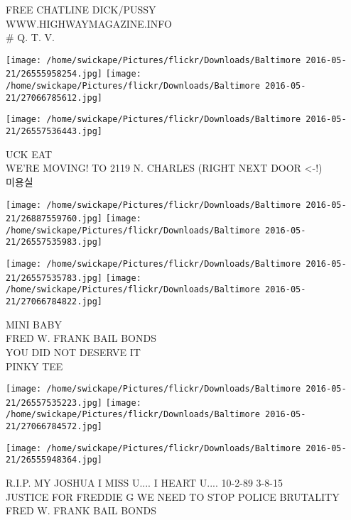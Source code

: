\documentclass[10pt,letterpaper]{article}
\begin{document}
FREE CHATLINE DICK/PUSSY\\
WWW.HIGHWAYMAGAZINE.INFO\\
\# Q. T. V.\\
\pagebreak

\texttt{[image: /home/swickape/Pictures/flickr/Downloads/Baltimore 2016-05-21/26555958254.jpg]}
\texttt{[image: /home/swickape/Pictures/flickr/Downloads/Baltimore 2016-05-21/27066785612.jpg]}

\vspace{0.25in}
\texttt{[image: /home/swickape/Pictures/flickr/Downloads/Baltimore 2016-05-21/26557536443.jpg]}

UCK EAT\\
WE'RE MOVING!  TO 2119 N. CHARLES (RIGHT NEXT DOOR <{-}!)\\
미용실\\
\pagebreak

\texttt{[image: /home/swickape/Pictures/flickr/Downloads/Baltimore 2016-05-21/26887559760.jpg]}
\texttt{[image: /home/swickape/Pictures/flickr/Downloads/Baltimore 2016-05-21/26557535983.jpg]}

\texttt{[image: /home/swickape/Pictures/flickr/Downloads/Baltimore 2016-05-21/26557535783.jpg]}
\texttt{[image: /home/swickape/Pictures/flickr/Downloads/Baltimore 2016-05-21/27066784822.jpg]}

MINI BABY\\
FRED W. FRANK BAIL BONDS\\
YOU DID NOT DESERVE IT\\
PINKY TEE\\
\pagebreak

\texttt{[image: /home/swickape/Pictures/flickr/Downloads/Baltimore 2016-05-21/26557535223.jpg]}
\texttt{[image: /home/swickape/Pictures/flickr/Downloads/Baltimore 2016-05-21/27066784572.jpg]}

\vspace{0.25in}
\texttt{[image: /home/swickape/Pictures/flickr/Downloads/Baltimore 2016-05-21/26555948364.jpg]}

R.I.P. MY JOSHUA I MISS U.... I HEART U.... 10{-}2{-}89 3{-}8{-}15\\
JUSTICE FOR FREDDIE G WE NEED TO STOP POLICE BRUTALITY\\
FRED W. FRANK BAIL BONDS\\
\pagebreak
\end{document}
